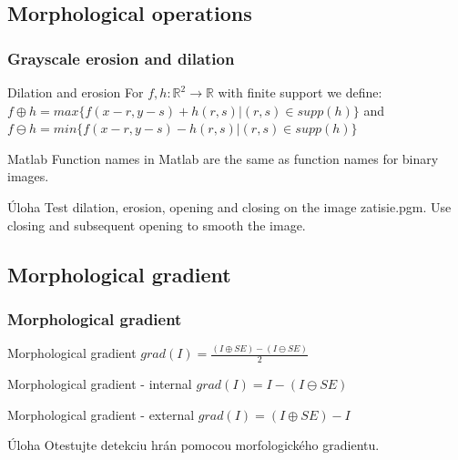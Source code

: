 \documentclass{beamer}
\begin{document}
\subsection{Morphological operations}

\begin{frame}
\frametitle{Grayscale erosion and dilation} 

  \begin{block}{Dilation and erosion}
  For $f, h \colon \mathbb{R}^2 \to \mathbb{R}$ with finite support we define: \\ $f \oplus h = max\{ f(x-r, y-s) + h (r,s) | (r,s) \in supp(h)\}$ and \\
  $f \ominus h = min\{ f(x-r, y-s) - h (r,s) | (r,s) \in supp(h)\}$
  \end{block}   

  \begin{block}{Matlab}
  Function names in Matlab are the same as function names for binary images.
  \end{block}
  
  \begin{block}{Úloha}
  Test dilation, erosion, opening and closing on the image zatisie.pgm. Use closing and subsequent opening to smooth the image.
  \end{block}   
\end{frame}


\subsection{Morphological gradient}

\begin{frame}
\frametitle{Morphological gradient} 

  \begin{block}{Morphological gradient}
  $grad(I) = \frac{(I \oplus SE) - (I \ominus SE)}{2}$
  \end{block}   

  \begin{block}{Morphological gradient - internal}
  $grad(I) = I - (I \ominus SE)$
  \end{block}     
  
  \begin{block}{Morphological gradient - external}
  $grad(I) = (I \oplus SE) - I$
  \end{block}     
  
  \begin{block}{Úloha}
  Otestujte detekciu hrán pomocou morfologického gradientu.
  \end{block}   
\end{frame}
\end{document}
